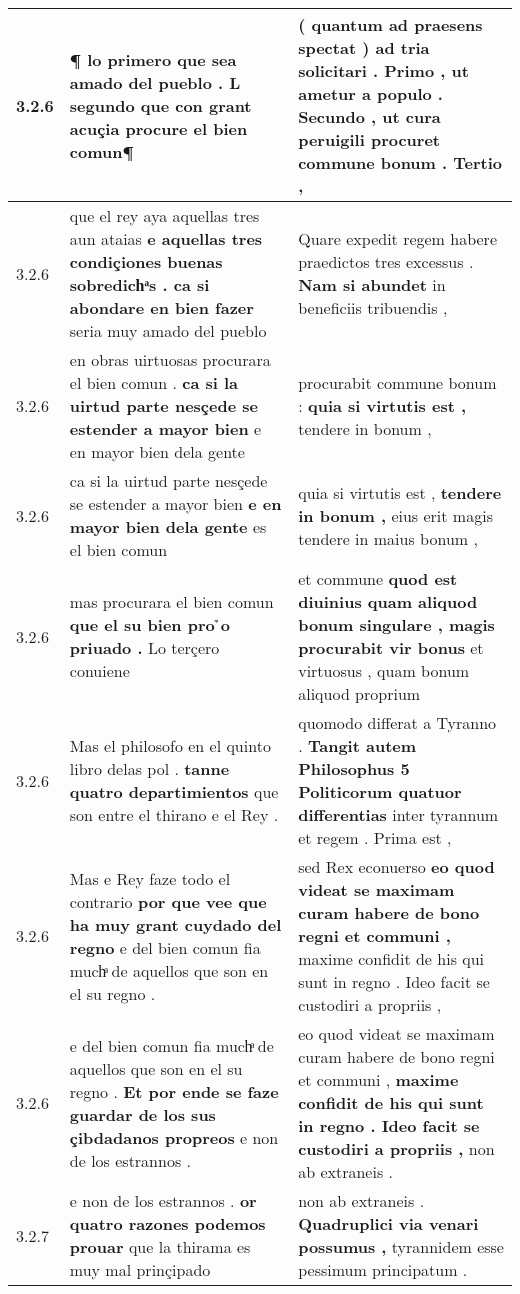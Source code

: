 \begin{tabular}{|p{1cm}|p{6.5cm}|p{6.5cm}|}
3.2.6 & ¶ lo primero que sea amado del pueblo . \textbf{ L segundo que con grant acuçia procure el bien } comun¶ & ( quantum ad praesens spectat ) ad tria solicitari . Primo , \textbf{ ut ametur a populo . Secundo , ut cura peruigili procuret commune bonum . } Tertio , \\\hline
3.2.6 & que el rey aya aquellas tres aun ataias \textbf{ e aquellas tres condiçiones buenas sobredichͣs . ca si abondare en bien fazer } seria muy amado del pueblo & Quare expedit regem habere praedictos tres excessus . \textbf{ Nam si abundet } in beneficiis tribuendis , \\\hline
3.2.6 & en obras uirtuosas procurara el bien comun . \textbf{ ca si la uirtud parte nesçede se estender a mayor bien } e en mayor bien dela gente & procurabit commune bonum : \textbf{ quia si virtutis est , } tendere in bonum , \\\hline
3.2.6 & ca si la uirtud parte nesçede se estender a mayor bien \textbf{ e en mayor bien dela gente } es el bien comun & quia si virtutis est , \textbf{ tendere in bonum , } eius erit magis tendere in maius bonum , \\\hline
3.2.6 & mas procurara el bien comun \textbf{ que el su bien pro ̉o priuado . } Lo terçero conuiene & et commune \textbf{ quod est diuinius quam aliquod bonum singulare , magis procurabit vir bonus } et virtuosus , quam bonum aliquod proprium \\\hline
3.2.6 & Mas el philosofo en el quinto libro delas pol . \textbf{ tanne quatro departimientos } que son entre el thirano e el Rey . & quomodo differat a Tyranno . \textbf{ Tangit autem Philosophus 5 Politicorum quatuor differentias } inter tyrannum et regem . Prima est , \\\hline
3.2.6 & Mas e Rey faze todo el contrario \textbf{ por que vee que ha muy grant cuydado del regno } e del bien comun fia muchͣ de aquellos que son en el su regno . & sed Rex econuerso \textbf{ eo quod videat se maximam curam habere de bono regni et communi , } maxime confidit de his qui sunt in regno . Ideo facit se custodiri a propriis , \\\hline
3.2.6 & e del bien comun fia muchͣ de aquellos que son en el su regno . \textbf{ Et por ende se faze guardar de los sus çibdadanos propreos } e non de los estrannos . & eo quod videat se maximam curam habere de bono regni et communi , \textbf{ maxime confidit de his qui sunt in regno . Ideo facit se custodiri a propriis , } non ab extraneis . \\\hline
3.2.7 & e non de los estrannos . \textbf{ or quatro razones podemos prouar } que la thirama es muy mal prinçipado & non ab extraneis . \textbf{ Quadruplici via venari possumus , } tyrannidem esse pessimum principatum . \\\hline

\end{tabular}
